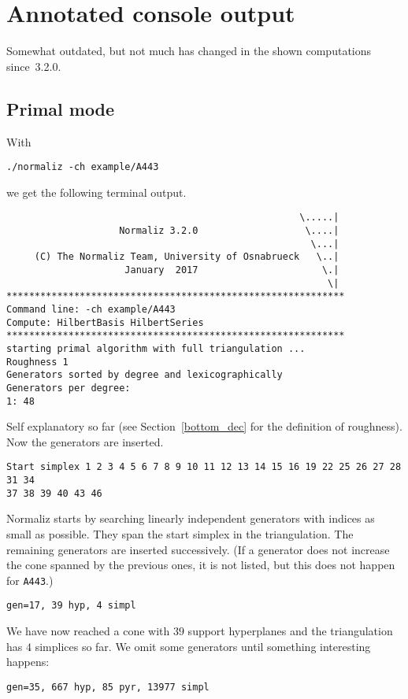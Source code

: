 \documentclass[12pt,a4paper]{scrartcl}
\theoremstyle{definition}
\begin{document}
\section{Annotated console output}\label{Console}

Somewhat outdated, but not much has changed in the shown computations since~3.2.0.

\subsection{Primal mode}

With
\begin{Verbatim}
./normaliz -ch example/A443
\end{Verbatim}
we get the following terminal output.

\begin{Verbatim}
                                                    \.....|
                    Normaliz 3.2.0                   \....|
                                                      \...|
     (C) The Normaliz Team, University of Osnabrueck   \..|
                     January  2017                      \.|
                                                         \|
************************************************************
Command line: -ch example/A443 
Compute: HilbertBasis HilbertSeries 
************************************************************
starting primal algorithm with full triangulation ...
Roughness 1
Generators sorted by degree and lexicographically
Generators per degree:
1: 48 
\end{Verbatim}
Self explanatory so far (see Section~\ref{bottom_dec} for the definition of roughness). Now the generators are inserted.
\begin{Verbatim}
Start simplex 1 2 3 4 5 6 7 8 9 10 11 12 13 14 15 16 19 22 25 26 27 28 31 34 
37 38 39 40 43 46 
\end{Verbatim}
Normaliz starts by searching linearly independent generators with indices as small as possible. They span the start simplex in the triangulation. The remaining generators are inserted successively. (If a generator does not increase the cone spanned by the previous ones, it is not listed, but this does not happen for \verb|A443|.)
\begin{Verbatim}
gen=17, 39 hyp, 4 simpl
\end{Verbatim}
We have now reached a cone with $39$ support hyperplanes and the triangulation has $4$ simplices so far. We omit some generators until something interesting happens:
\begin{Verbatim}
gen=35, 667 hyp, 85 pyr, 13977 simpl
\end{Verbatim}
\end{document}
